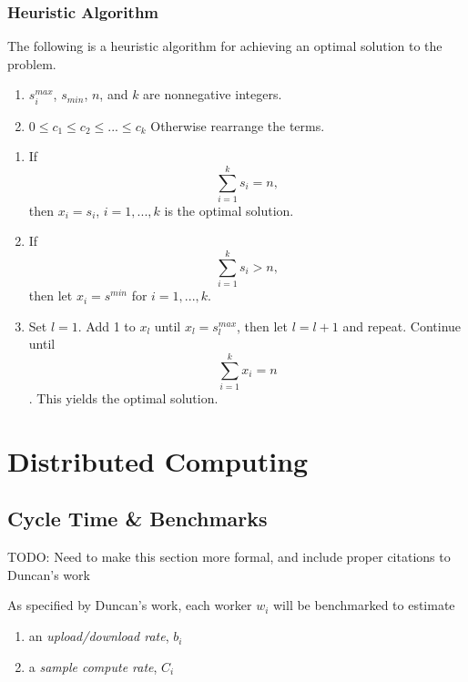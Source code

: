 \documentclass[../mthe-493-final-project.tex]{subfiles}
\begin{document}
    \subsubsection{Heuristic Algorithm}
    The following is a heuristic algorithm for achieving an optimal solution to the problem.

    \begin{enumerate}
        \item $s_i^{max}$, $s_{min}$, $n$, and $k$ are nonnegative integers.
        \item $0 \leq c_1 \leq c_2 \leq ... \leq c_k$ Otherwise rearrange the terms.
    \end{enumerate}

    \begin{enumerate}
        \item If \[ \sum_{i=1}^k s_i = n, \] then $x_i = s_i$, $i = 1,...,k$ is the optimal solution.
        \item If \[\sum_{i=1}^k s_i > n,\] then let $x_i = s^{min}$ for $i = 1,...,k$.
        \item Set $l = 1$. Add 1 to $x_l$ until $x_l = s_l^{max}$, then let $l = l+1$ and repeat. Continue until \[ \sum_{i=1}^{k} x_i = n \]. This yields the optimal solution.
    \end{enumerate}
    
    \section{Distributed Computing}
    \label{sec:Distributed-Computing}
    
    \subsection{Cycle Time \& Benchmarks}
    \label{ssec:cycle-time-and-benchmarks}

    TODO: Need to make this section more formal, and include proper citations to Duncan's work

    As specified by Duncan's work, each worker $w_i$ will be benchmarked to estimate

    \begin{enumerate}
        \item an \textit{upload/download rate}, $b_i$
        \item a \textit{sample compute rate}, $C_i$
    \end{enumerate}
\end{document}
